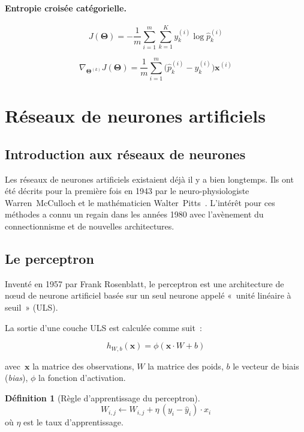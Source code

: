 \documentclass[a4paper,12pt,twoside]{report}
\theoremstyle{definition}
\newtheorem{defi}{Définition}
\theoremstyle{plain}
\theoremstyle{remark}
\newcommand{\rv}[1]{\boldsymbol{#1}}
\begin{document}
\paragraph{Entropie croisée catégorielle.}

\[
J(\rv{\Theta}) = -\frac{1}{m}\sum_{i=1}^{m}\sum_{k=1}^{K}
y_k^{(i)}\log\hat{p}_k^{(i)}
\]

\[
\nabla_{\rv{\Theta}^{(k)}}J(\rv{\Theta}) =
\frac{1}{m}\sum_{i=1}^{m}\bigl(\hat{p}_k^{(i)} - y_k^{(i)}\bigr)\rv{x}^{(i)}
\]

\section{Réseaux de neurones artificiels}
\label{sec:nn}

\subsection{Introduction aux réseaux de neurones}

Les réseaux de neurones artificiels existaient déjà il y a bien longtemps. Ils ont été
décrits pour la première fois en 1943 par le neuro-physiologiste Warren~McCulloch et le
mathématicien Walter~Pitts~\cite{geron2023deeplearning}. L'intérêt pour ces méthodes
a connu un regain dans les années 1980 avec l'avènement du connectionnisme et de nouvelles
architectures.

\subsection{Le perceptron}
\label{subsec:perceptron}

Inventé en 1957 par Frank Rosenblatt, le perceptron est une architecture de nœud de neurone
artificiel basée sur un seul neurone appelé «~unité linéaire à seuil~» (\ac{ULS}).

La sortie d'une couche ULS est calculée comme suit~:

\begin{equation}
h_{W,b}(\rv{x}) = \phi(\rv{x} \cdot W + b)
\label{eq:perceptron}
\end{equation}

avec~$\rv{x}$ la matrice des observations, $W$ la matrice des poids, $b$ le vecteur de biais
(\textit{bias}), $\phi$ la fonction d'activation.

\begin{defi}[Règle d'apprentissage du perceptron]
\[
W_{i,j} \leftarrow W_{i,j} + \eta\,(y_i - \hat{y}_i)\cdot x_i
\]
où $\eta$ est le taux d'apprentissage.
\end{defi}
\end{document}
